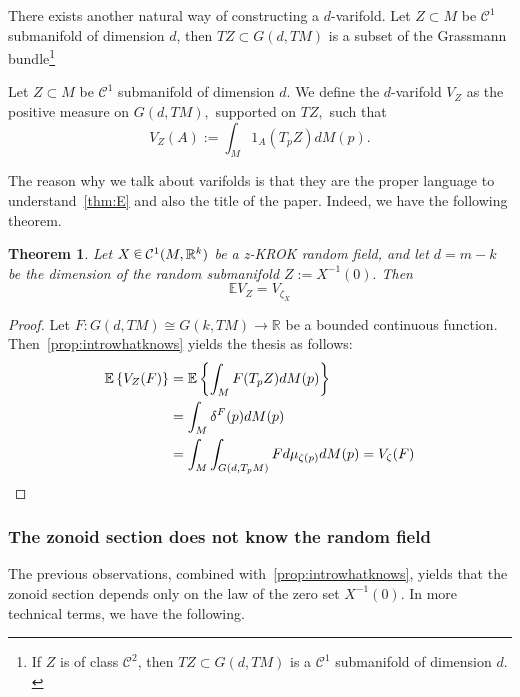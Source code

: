 \documentclass[AHL, Unicode, longabstracts, published]{cedram}
\newtheorem{mainthm}{Theorem}
\newcommand{\R}{\mathbb{R}}
\newcommand{\EE}{\mathbb{E}}
\newcommand{\mC}{\mathcal{C}}
\newcommand{\zkrok}{\emph{z-KROK}\xspace}
\newcommand*\randin{
\mathchoice {\raisebox{-.35ex}{$\displaystyle{^\subset}$}\mkern-11.5mu\raisebox{+.45ex}{$\displaystyle{_\subset}$}} {\mkern+1mu\raisebox{-.27ex}{$\textstyle{^\subset}$}\mkern-11.7mu\raisebox{+.45ex}{$\textstyle{_\subset}$}} {\raisebox{.35ex}{$\scriptstyle\subset$}\mkern-14mu\raisebox{-.15ex}{$\scriptstyle\subset$}} {\raisebox{.3ex}{$\scriptscriptstyle\subset$}\mkern-13.5mu\raisebox{-.10ex}{$\scriptscriptstyle\subset$}}}
\begin{document}
There exists another natural way of constructing a $d$-varifold. Let $Z\subset M$ be $\mC^1$ submanifold of dimension $d$, then $TZ\subset G(d,TM)$ is a subset of the Grassmann bundle\footnote{If $Z$ is of class $\mC^2$, then $TZ\subset G(d,TM)$ is a $\mC^1$ submanifold of dimension $d.$}

\begin{defi}
Let $Z\subset M$ be $\mC^1$ submanifold of dimension $d$. We define the $d$-varifold $V_{Z}$ as the positive measure on $G(d,TM),$ supported on $TZ,$ such that
\begin{equation*}
V_{Z}(A):=\int_M 1_A(T_pZ)dM(p).
\end{equation*}
\end{defi}

The reason why we talk about varifolds is that they are the proper language to understand~\cref{thm:E} and also the title of the paper. Indeed, we have the following theorem.

\begin{mainthm}\label{thm:title}
Let $X\,\randin\, \mC^1(M,\R^k)$ be a \zkrok random field, and let $d=m-k$ be the dimension of the random submanifold $Z:=X^{-1}(0).$ Then
\begin{equation*}
\EE V_Z=V_{\zeta_X}
\end{equation*}
\end{mainthm}


\begin{proof}
Let $F\colon G(d,TM)\cong G(k,TM)\to \R$ be a bounded continuous function. Then~\cref{prop:introwhatknows} yields the thesis as follows:
\begin{align*}
\EE\left\{ V_Z(F)\right\} &=\EE\left\{ \int_M F(T_pZ)dM(p)\right\}
\\
&= \int_M \delta^F(p) dM(p)
\\
&= \int_M \int_{G\left(d,T_pM\right)}Fd\mu_{\zeta(p)} dM(p)=V_{\zeta}(F)\qedhere
\end{align*}
\end{proof}


\subsubsection{The zonoid section does not know the random field}

The previous observations, combined with~\cref{prop:introwhatknows}, yields that the zonoid section depends only on the law of the zero set $X^{-1}(0)$. In more technical terms, we have the following.
\end{document}
